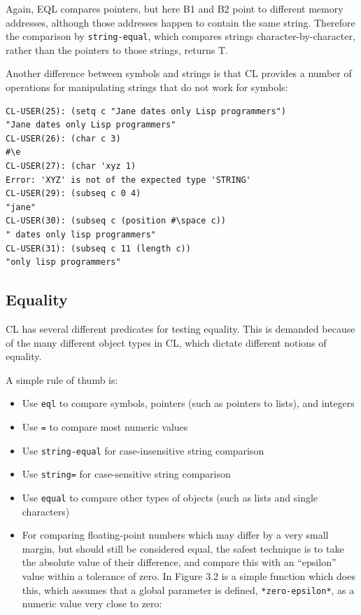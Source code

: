 Again, EQL compares pointers, but here B1 and B2 point to different memory addresses,
although those addresses happen to contain the same string. Therefore the comparison by
\texttt{string-equal}, which compares strings character-by-character, rather than the pointers to
those strings, returns T.

Another difference between symbols and strings is that CL provides a number of operations for manipulating strings that do not work for symbols:

\begin{verbatim}
CL-USER(25): (setq c "Jane dates only Lisp programmers")
"Jane dates only Lisp programmers"
CL-USER(26): (char c 3)
#\e
CL-USER(27): (char 'xyz 1)
Error: 'XYZ' is not of the expected type 'STRING'
CL-USER(29): (subseq c 0 4)
"jane"
CL-USER(30): (subseq c (position #\space c))
" dates only lisp programmers"
CL-USER(31): (subseq c 11 (length c))
"only lisp programmers"
\end{verbatim}

\subsection{Equality}

CL has several different predicates for testing equality. This is demanded because of the
many different object types in CL, which dictate different notions of equality.

A simple rule of thumb is:

\begin{itemize}
\item Use \texttt{eql} to compare symbols, pointers (such as pointers to lists), and integers
\item Use \texttt{=} to compare most numeric values
\item Use \texttt{string-equal} for case-insensitive string comparison
\item Use \texttt{string=} for case-sensitive string comparison
\item Use \texttt{equal} to compare other types of objects (such as lists and single characters)
\item For comparing floating-point numbers which may differ by a very small margin, but
should still be considered equal, the safest technique is to take the absolute value
of their difference, and compare this with an ``epsilon'' value within a tolerance of
zero. In Figure 3.2 is a simple function which does this, which assumes that a global
parameter is defined, \texttt{*zero-epsilon*}, as a numeric value very close to zero:
\end{itemize}

